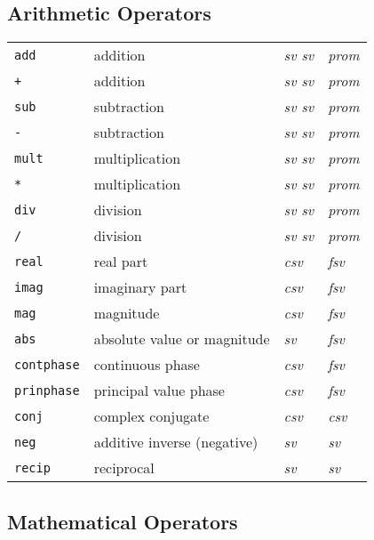 \subsection*{Arithmetic Operators}

\begin{tabular}{p{.8in}p{2.5in}p{1.0in}p{.75in}}
{\tt add} & addition & {\it sv \newline sv} & {\it prom} \\
{\verb:+:} & addition & {\it sv \newline sv} & {\it prom} \\
{\tt sub} & subtraction & {\it sv \newline sv} & {\it prom} \\
{\verb:-:} & subtraction & {\it sv \newline sv} & {\it prom} \\
{\tt mult} & multiplication & {\it sv \newline sv} & {\it prom} \\
{\verb:*:} & multiplication & {\it sv \newline sv} & {\it prom} \\
{\tt div} & division & {\it sv \newline sv} & {\it prom} \\
{\verb:/:} & division & {\it sv \newline sv} & {\it prom} \\
{\tt real} & real part & {\it csv} & {\it fsv} \\
{\tt imag} & imaginary part & {\it csv} & {\it fsv} \\
{\tt mag} & magnitude & {\it csv} & {\it fsv} \\
{\tt abs} & absolute value or magnitude & {\it sv} & {\it fsv} \\
{\tt contphase} & continuous phase & {\it csv} & {\it fsv} \\
{\tt prinphase} & principal value phase & {\it csv} & {\it fsv} \\
{\tt conj} & complex conjugate & {\it csv} & {\it csv} \\
{\tt neg} & additive inverse (negative) & {\it sv} & {\it sv} \\
{\tt recip} & reciprocal & {\it sv} & {\it sv}
\end{tabular}
\newpage
\subsection*{Mathematical Operators}

